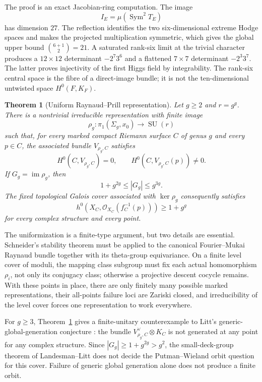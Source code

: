 \documentclass[11pt,reqno]{amsart}
\numberwithin{equation}{section}
\newtheorem{theorem}{Theorem}[section]
\theoremstyle{definition}
\theoremstyle{remark}
\newcommand{\OO}{\mathcal O}
\newcommand{\im}{\operatorname{im}}
\newcommand{\Sym}{\operatorname{Sym}}
\newcommand{\SU}{\operatorname{SU}}
\begin{document}
The proof is an exact Jacobian-ring computation.  The image
\[
I_E=\mu(\Sym^2T_E)
\]
has dimension $27$.  The reflection identifies the two six-dimensional extreme Hodge spaces and makes the projected multiplication symmetric, which gives the global upper bound $\binom{6+1}{2}=21$.  A saturated rank-six limit at the trivial character produces a $12\times12$ determinant $-2^7 3^6$ and a flattened $7\times7$ determinant $-2^3 3^7$.  The latter proves injectivity of the first Higgs field by integrability.  The rank-six central space is the fibre of a direct-image bundle; it is not the ten-dimensional untwisted space $H^0(F,K_F)$.

\begin{theorem}[Uniform Raynaud--Prill representation]\label{thm:intro-uniform}
Let $g\ge2$ and $r=g^g$.  There is a nontrivial irreducible representation with finite image
\[
\rho_g:\pi_1(\Sigma_g,x_0)\longrightarrow \SU(r)
\]
such that, for every marked compact Riemann surface $C$ of genus $g$ and every $p\in C$, the associated bundle $V_{\rho_g,C}$ satisfies
\[
H^0(C,V_{\rho_g,C})=0,
\qquad H^0(C,V_{\rho_g,C}(p))\ne0.
\]
If $G_g=\im\rho_g$, then
\[
1+g^{2g}\le |G_g|\le g^{3g}.
\]
The fixed topological Galois cover associated with $\ker\rho_g$ consequently satisfies
\[
h^0\!\left(X_C,\OO_{X_C}(f_C^{-1}(p))\right)\ge1+g^g
\]
for every complex structure and every point.
\end{theorem}

The uniformization is a finite-type argument, but two details are essential.  Schneider's stability theorem must be applied to the canonical Fourier--Mukai Raynaud bundle together with its theta-group equivariance.  On a finite level cover of moduli, the mapping class subgroup must fix each actual homomorphism $\rho_i$, not only its conjugacy class; otherwise a projective descent cocycle remains.  With these points in place, there are only finitely many possible marked representations, their all-points failure loci are Zariski closed, and irreducibility of the level cover forces one representation to work everywhere.

For $g\ge3$, Theorem~\ref{thm:intro-uniform} gives a finite-unitary counterexample to Litt's generic-global-generation conjecture \cite[Conjecture~6.3.5]{Litt2024}: the bundle $V_{\rho_g,C}^{\vee}\otimes K_C$ is not generated at any point for any complex structure.  Since $|G_g|\ge1+g^{2g}>g^2$, the small-deck-group theorem of Landesman--Litt \cite[Theorem~1.2]{LandesmanLitt2023} does not decide the Putman--Wieland orbit question for this cover.  Failure of generic global generation alone does not produce a finite orbit.
\end{document}
